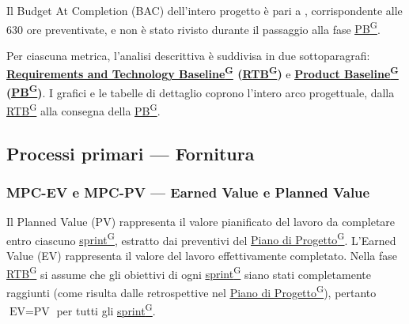 \documentclass[a4paper,12pt]{article}
\providecommand{\glslink}[2]{\href{https://alittlebyte-19.github.io/Documentazione/glossario.html\#gls-#1}{\underline{#2}\textsuperscript{\scriptsize G}}}
\begin{document}
Il Budget At Completion (BAC) dell'intero progetto è pari a , corrispondente alle 630 ore preventivate, e non è stato rivisto durante il passaggio alla fase \glslink{pb-product-baseline}{PB}.

Per ciascuna metrica, l'analisi descrittiva è suddivisa in due sottoparagrafi: \textbf{\glslink{rtb-requirements-and-technology-baseline}{Requirements and Technology Baseline} (\glslink{rtb-requirements-and-technology-baseline}{RTB})} e \textbf{\glslink{pb-product-baseline}{Product Baseline} (\glslink{pb-product-baseline}{PB})}. I grafici e le tabelle di dettaglio coprono l'intero arco progettuale, dalla \glslink{rtb-requirements-and-technology-baseline}{RTB} alla consegna della \glslink{pb-product-baseline}{PB}.
\subsection{Processi primari — Fornitura}

\subsubsection{MPC-EV e MPC-PV — Earned Value e Planned Value}

Il Planned Value (PV) rappresenta il valore pianificato del lavoro da completare entro ciascuno \glslink{sprint}{sprint}, estratto dai preventivi del \glslink{piano-di-progetto}{Piano di Progetto}. L'Earned Value (EV) rappresenta il valore del lavoro effettivamente completato. Nella fase \glslink{rtb-requirements-and-technology-baseline}{RTB} si assume che gli obiettivi di ogni \glslink{sprint}{sprint} siano stati completamente raggiunti (come risulta dalle retrospettive nel \glslink{piano-di-progetto}{Piano di Progetto}), pertanto $\text{EV} = \text{PV}$ per tutti gli \glslink{sprint}{sprint}.
\end{document}
